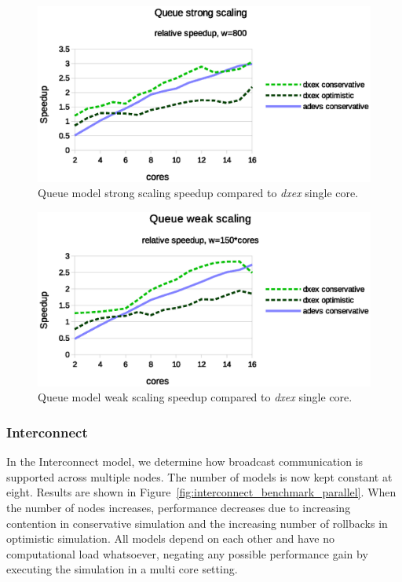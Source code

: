 \begin{figure}
	\center
	\includegraphics[width=\columnwidth]{fig/queue_fixed_strong_speedup.eps}
	\caption{Queue model strong scaling speedup compared to \textit{dxex} single core.}
	\label{fig:Queue_plot_strong}
\end{figure}

\begin{figure}
	\center
	\includegraphics[width=\columnwidth]{fig/queue_fixed_weak_speedup.eps}
	\caption{Queue model weak scaling speedup compared to \textit{dxex} single core.}
	\label{fig:Queue_plot_weak}
\end{figure}
	
\subsubsection{Interconnect}
\label{subsec:parallelinterconnect}
In the Interconnect model, we determine how broadcast communication is supported across multiple nodes.
The number of models is now kept constant at eight.
Results are shown in Figure~\ref{fig:interconnect_benchmark_parallel}.
When the number of nodes increases, performance decreases due to increasing contention in conservative simulation and the increasing number of rollbacks in optimistic simulation.
All models depend on each other and have no computational load whatsoever, negating any possible performance gain by executing the simulation in a multi core setting.

